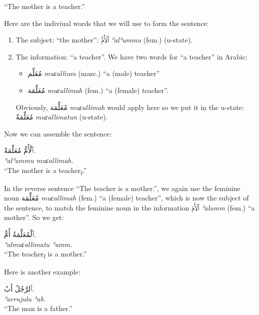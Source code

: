 \documentclass[
  10pt,
]{book}
\providecommand{\tightlist}{%
  \setlength{\itemsep}{0pt}\setlength{\parskip}{0pt}}
\begin{document}
\enquote{The mother is a teacher.}

Here are the indiviual words that we will use to form the sentence:

\begin{enumerate}
\def\labelenumi{\roman{enumi}.}
\item
  The subject: \enquote{the mother}: \foreignlanguage{arabic}{ٱَلْأُمُّ} \emph{ʾalʾummu} (fem.) (u-state).
\item
  The information: \enquote{a teacher}. We have two words for \enquote{a teacher} in Arabic:

  \begin{itemize}
  \tightlist
  \item
    \foreignlanguage{arabic}{مُعَلِّم} \emph{muɛallium} (masc.) \enquote{a (male) teacher}
  \item
    \foreignlanguage{arabic}{مُعَلِّمَة} \emph{muɛallimah} (fem.) \enquote{a (female) teacher}.
  \end{itemize}

  Obviously, \foreignlanguage{arabic}{مُعَلِّمَة} \emph{muɛallimah} would apply here so we put it in the u-state: \foreignlanguage{arabic}{مُعَلِّمَةٌ} \emph{muɛallimatun}
  (u-state).
\end{enumerate}

Now we can assemble the sentence:

\foreignlanguage{arabic}{ٱَلْأُمُّ مُعَلِّمَةٌ.}\\
\emph{ʾalʾummu muɛallimah.}\\
\enquote{The mother is a teacher\textsubscript{f}.}

In the reverse sentence \enquote{The teacher is a mother.}, we again use the feminine noun
\foreignlanguage{arabic}{مُعَلِّمَة} \emph{muɛallimah} (fem.) \enquote{a (female) teacher},
which is now the subject of the sentence, to match the feminine noun in the information
\foreignlanguage{arabic}{ٱَلْأُمّ} \emph{ʾalumm} (fem.)
\enquote{a mother}. So we get:

\foreignlanguage{arabic}{ٱَلْمُعَلِّمَةُ أُمٌّ.}\\
\emph{ʾalmuɛallimatu ʾumm.}\\
\enquote{The teacher\textsubscript{f} is a mother.}

Here is another example:

\foreignlanguage{arabic}{ٱَلرَّجُلُ أَبٌ.}\\
\emph{ʾarrujulu ʾab.}\\
\enquote{The man is a father.}
\end{document}
